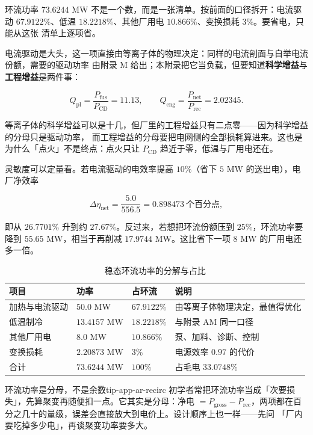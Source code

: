环流功率 $73.6244$ MW 不是一个数，而是一张清单。按前面的口径拆开：电流驱动
$67.9122\%$、低温 $18.2218\%$、其他厂用电 $10.866\%$、变换损耗 $3\%$。要省电，只能从这张
清单上逐项省。

电流驱动是大头，这一项直接由等离子体的物理决定：同样的电流剖面与自举电流份额，需要的驱动功率
由附录 M 给出；本附录把它当负载，但要知道\textbf{科学增益}与\textbf{工程增益}是两件事：

\begin{equation}
Q_\mathrm{pl}=\frac{P_\mathrm{fus}}{P_\mathrm{CD}}=11.13,
\qquad
Q_\mathrm{eng}=\frac{P_\mathrm{net}}{P_\mathrm{rec}}=2.02345 .
\label{eq:app-ar-qeng}
\end{equation}

等离子体的科学增益可以是十几，但厂里的工程增益只有二点零——因为科学增益的分母只是驱动功率，
而工程增益的分母要把电网侧的全部损耗算进来。这也是为什么「点火」不是终点：点火只让 $P_\mathrm{CD}$
趋近于零，低温与厂用电还在。

灵敏度可以定量看。若电流驱动的电效率提高 $10\%$（省下 $5$ MW 的送出电），电厂净效率

\begin{equation}
\Delta\eta_\mathrm{net}=\frac{5.0}{556.5}=0.898473\ \text{个百分点},
\label{eq:app-ar-sens}
\end{equation}

即从 $26.7701\%$ 升到约 $27.67\%$。反过来，若想把环流份额压到 $25\%$，环流功率要降到
$55.65$ MW，相当于再削减 $17.9744$ MW。这比省下一项 $8$ MW 的厂用电还多一倍。

\begin{table}[htbp]
\centering
\small
\caption{稳态环流功率的分解与占比}
\label{tab:app-ar-recirc}
\begin{tabular}{p{3.0cm}p{2.4cm}p{2.2cm}p{5.3cm}}
\hline
项目 & 功率 & 占环流 & 说明 \\
\hline
加热与电流驱动 & $50.0$ MW & $67.9122\%$ & 由等离子体物理决定，最值得优化 \\
低温制冷 & $13.4157$ MW & $18.2218\%$ & 与附录 AM 同一口径 \\
其他厂用电 & $8.0$ MW & $10.866\%$ & 泵、加料、诊断、控制 \\
变换损耗 & $2.20873$ MW & $3\%$ & 电源效率 $0.97$ 的代价 \\
\hline
合计 & $73.6244$ MW & $100\%$ & 占毛电 $33.0748\%$ \\
\hline
\end{tabular}
\end{table}

\begin{tip}{环流功率是分母，不是余数}{tip-app-ar-recirc}
初学者常把环流功率当成「次要损失」，先算聚变再随便扣一点。它其实是分母：净电 $=P_\mathrm{gross}
-P_\mathrm{rec}$，两项都在百分之几十的量级，误差会直接放大到电价上。设计顺序上也一样——先问
「厂内要吃掉多少电」，再谈聚变功率要多大。
\end{tip}

